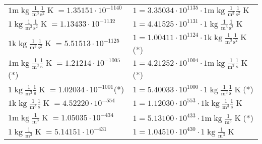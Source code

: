 \begin{center}
\begin{longtable}{l l}
\hline{\color{gray}$1 \bm{\mathrm{ m}}\operatorname{kg}\frac1{\operatorname{m}^3}\frac1{\operatorname{s}^2}{}{\operatorname{K}} = 1.35151\cdot10^{-1140} $}   & {\color{gray}$ 1 = 3.35034\cdot10^{1135} \cdot 1 \bm{\mathrm{ m}}\operatorname{kg}\frac1{\operatorname{m}^3}\frac1{\operatorname{s}^2}{}{\operatorname{K}}$}  \\
{\color{black}$1 \bm{\mathrm{ }}\operatorname{kg}\frac1{\operatorname{m}^3}\frac1{\operatorname{s}^2}{}{\operatorname{K}} = 1.13433\cdot10^{-1132} $}   & {\color{black}$ 1 = 4.41525\cdot10^{1131} \cdot 1 \bm{\mathrm{ }}\operatorname{kg}\frac1{\operatorname{m}^3}\frac1{\operatorname{s}^2}{}{\operatorname{K}}$}  \\
{\color{gray}$1 \bm{\mathrm{ k}}\operatorname{kg}\frac1{\operatorname{m}^3}\frac1{\operatorname{s}^2}{}{\operatorname{K}} = 5.51513\cdot10^{-1125} $}   & {\color{gray}$ 1 = 1.00411\cdot10^{1124} \cdot 1 \bm{\mathrm{ k}}\operatorname{kg}\frac1{\operatorname{m}^3}\frac1{\operatorname{s}^2}{}{\operatorname{K}}$}\quad(*)\\
{\color{gray}$1 \bm{\mathrm{ m}}\operatorname{kg}\frac1{\operatorname{m}^3}\frac1{\operatorname{s}}{}{\operatorname{K}} = 1.21214\cdot10^{-1005} $}\quad(*) & {\color{gray}$ 1 = 4.21252\cdot10^{1004} \cdot 1 \bm{\mathrm{ m}}\operatorname{kg}\frac1{\operatorname{m}^3}\frac1{\operatorname{s}}{}{\operatorname{K}}$}\quad(*)\\
{\color{black}$1 \bm{\mathrm{ }}\operatorname{kg}\frac1{\operatorname{m}^3}\frac1{\operatorname{s}}{}{\operatorname{K}} = 1.02034\cdot10^{-1001} $}\quad(*) & {\color{black}$ 1 = 5.40033\cdot10^{1000} \cdot 1 \bm{\mathrm{ }}\operatorname{kg}\frac1{\operatorname{m}^3}\frac1{\operatorname{s}}{}{\operatorname{K}}$}\quad(*)\\
{\color{gray}$1 \bm{\mathrm{ k}}\operatorname{kg}\frac1{\operatorname{m}^3}\frac1{\operatorname{s}}{}{\operatorname{K}} = 4.52220\cdot10^{-554} $}   & {\color{gray}$ 1 = 1.12030\cdot10^{553} \cdot 1 \bm{\mathrm{ k}}\operatorname{kg}\frac1{\operatorname{m}^3}\frac1{\operatorname{s}}{}{\operatorname{K}}$}  \\
{\color{gray}$1 \bm{\mathrm{ m}}\operatorname{kg}\frac1{\operatorname{m}^3}{}{}{\operatorname{K}} = 1.05035\cdot10^{-434} $}   & {\color{gray}$ 1 = 5.13100\cdot10^{433} \cdot 1 \bm{\mathrm{ m}}\operatorname{kg}\frac1{\operatorname{m}^3}{}{}{\operatorname{K}}$}\quad(*)\\
{\color{black}$1 \bm{\mathrm{ }}\operatorname{kg}\frac1{\operatorname{m}^3}{}{}{\operatorname{K}} = 5.14151\cdot10^{-431} $}   & {\color{black}$ 1 = 1.04510\cdot10^{430} \cdot 1 \bm{\mathrm{ }}\operatorname{kg}\frac1{\operatorname{m}^3}{}{}{\operatorname{K}}$}  \\

\end{longtable}
\end{center}
